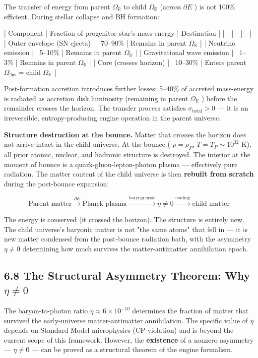 \documentclass[11pt,a4paper]{article}
\theoremstyle{definition}
\theoremstyle{remark}
\begin{document}
The transfer of energy from parent $\Omega_{\mathbb{R}}$ to child $\Omega_{\mathbb{R}}$ (across $\partial E$ ) is not 100\% efficient. During stellar collapse and BH formation:

| Component | Fraction of progenitor star's mass-energy | Destination |
|---|---|---|
| Outer envelope (SN ejecta) | ~70–90\% | Remains in parent $\Omega_{\mathbb{R}}$ |
| Neutrino emission | ~5–10\% | Remains in parent $\Omega_{\mathbb{R}}$ |
| Gravitational wave emission | ~1–3\% | Remains in parent $\Omega_{\mathbb{R}}$ |
| Core (crosses horizon) | ~10–30\% | Enters parent $\Omega_{\mathfrak{Im}}$ = child $\Omega_{\mathbb{R}}$ |

Post-formation accretion introduces further losses: 5–40\% of accreted mass-energy is radiated as accretion disk luminosity (remaining in parent $\Omega_{\mathbb{R}}$ ) before the remainder crosses the horizon. The transfer process satisfies $\sigma_{\text{total}} > 0$ — it is an irreversible, entropy-producing engine operation in the parent universe.

\textbf{Structure destruction at the bounce.} Matter that crosses the horizon does not arrive intact in the child universe. At the bounce ( $\rho = \rho_P$, $T = T_P \sim 10^{32}$ K), all prior atomic, nuclear, and hadronic structure is destroyed. The interior at the moment of bounce is a quark-gluon-lepton-photon plasma — effectively pure radiation. The matter content of the child universe is then \textbf{rebuilt from scratch} during the post-bounce expansion:


\begin{equation}
\text{Parent matter} \xrightarrow{\partial E} \text{Planck plasma} \xrightarrow{\text{baryogenesis}} \eta \neq 0 \xrightarrow{\text{cooling}} \text{child matter}
\end{equation}


The energy is conserved (it crossed the horizon). The structure is entirely new. The child universe's baryonic matter is not "the same atoms" that fell in — it is new matter condensed from the post-bounce radiation bath, with the asymmetry $\eta \neq 0$ determining how much survives the matter-antimatter annihilation epoch.

\subsection{6.8 The Structural Asymmetry Theorem: Why $\eta \neq 0$}

The baryon-to-photon ratio $\eta \approx 6 \times 10^{-10}$ determines the fraction of matter that survived the early-universe matter-antimatter annihilation. The specific value of $\eta$ depends on Standard Model microphysics (CP violation) and is beyond the current scope of this framework. However, the \textbf{existence} of a nonzero asymmetry — $\eta \neq 0$ — can be proved as a structural theorem of the engine formalism.
\end{document}
